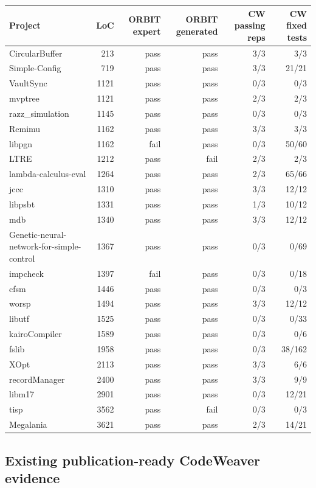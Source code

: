 \documentclass{article}
\begin{document}
\begin{tabular}{lrrrrr}
\toprule
Project & LoC & ORBIT expert & ORBIT generated & CW passing reps & CW fixed tests \\
\midrule
CircularBuffer & 213 & pass & pass & 3/3 & 3/3 \\
Simple-Config & 719 & pass & pass & 3/3 & 21/21 \\
VaultSync & 1121 & pass & pass & 0/3 & 0/3 \\
mvptree & 1121 & pass & pass & 2/3 & 2/3 \\
razz\_simulation & 1145 & pass & pass & 0/3 & 0/3 \\
Remimu & 1162 & pass & pass & 3/3 & 3/3 \\
libpgn & 1162 & fail & pass & 0/3 & 50/60 \\
LTRE & 1212 & pass & fail & 2/3 & 2/3 \\
lambda-calculus-eval & 1264 & pass & pass & 2/3 & 65/66 \\
jccc & 1310 & pass & pass & 3/3 & 12/12 \\
libpsbt & 1331 & pass & pass & 1/3 & 10/12 \\
mdb & 1340 & pass & pass & 3/3 & 12/12 \\
Genetic-neural-network-for-simple-control & 1367 & pass & pass & 0/3 & 0/69 \\
impcheck & 1397 & fail & pass & 0/3 & 0/18 \\
cfsm & 1446 & pass & pass & 0/3 & 0/3 \\
worsp & 1494 & pass & pass & 3/3 & 12/12 \\
libutf & 1525 & pass & pass & 0/3 & 0/33 \\
kairoCompiler & 1589 & pass & pass & 0/3 & 0/6 \\
fslib & 1958 & pass & pass & 0/3 & 38/162 \\
XOpt & 2113 & pass & pass & 3/3 & 6/6 \\
recordManager & 2400 & pass & pass & 3/3 & 9/9 \\
libm17 & 2901 & pass & pass & 0/3 & 12/21 \\
tisp & 3562 & pass & fail & 0/3 & 0/3 \\
Megalania & 3621 & pass & pass & 2/3 & 14/21 \\
\bottomrule
\end{tabular}

\subsection*{Existing publication-ready CodeWeaver evidence}
\end{document}
